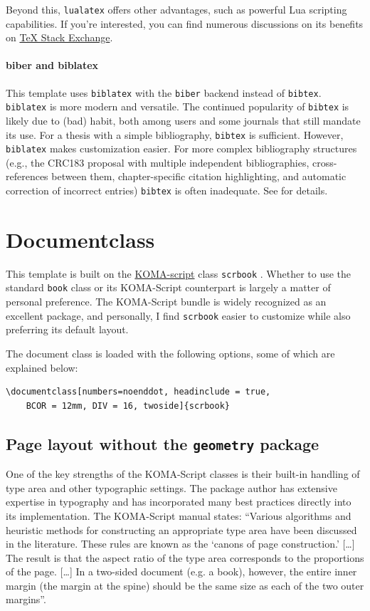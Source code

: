 Beyond this, \verb|lualatex| offers other advantages, such as powerful Lua scripting capabilities. If you're interested, you can find numerous discussions on its benefits on \href{tex.stackexchange.com}{TeX Stack Exchange}.

\paragraph{biber and biblatex}
This template uses \verb|biblatex| with the \verb|biber| backend instead of \verb|bibtex|. \verb|biblatex| is more modern and versatile. The continued popularity of \verb|bibtex| is likely due to (bad) habit, both among users and some journals that still mandate its use.
For a thesis with a simple bibliography, \verb|bibtex| is sufficient. However, \verb|biblatex| makes customization easier. For more complex bibliography structures (e.g., the CRC183 proposal with multiple independent bibliographies, cross-references between them, chapter-specific citation highlighting, and automatic correction of incorrect entries) \verb|bibtex| is often inadequate. See  for details.

\section{Documentclass}
This template is built on the \href{https://ctan.org/pkg/koma-script?lang=de}{KOMA-script} class \verb|scrbook| \cite{koma_manual}. Whether to use the standard \verb|book| class or its KOMA-Script counterpart is largely a matter of personal preference. The KOMA-Script bundle is widely recognized as an excellent package, and personally, I find \verb|scrbook| easier to customize while also preferring its default layout.

The document class is loaded with the following options, some of which are explained below:
\begin{lstlisting}
\documentclass[numbers=noenddot, headinclude = true,
	BCOR = 12mm, DIV = 16, twoside]{scrbook}
\end{lstlisting}

\subsection{Page layout without the \texttt{geometry} package}
One of the key strengths of the KOMA-Script classes is their built-in handling of type area and other typographic settings. The package author has extensive expertise in typography and has incorporated many best practices directly into its implementation. The KOMA-Script manual states:
 ``Various algorithms and heuristic methods for constructing an appropriate type area have been discussed in the literature. These rules are known as the `canons of page construction.' [\ldots] The result is that the aspect ratio of the type area corresponds to the proportions of the page. [\ldots] In a two-sided document (e.g. a book), however, the entire inner margin (the margin at the spine) should be the same size as each of the two outer margins''\cite{koma_manual}.

